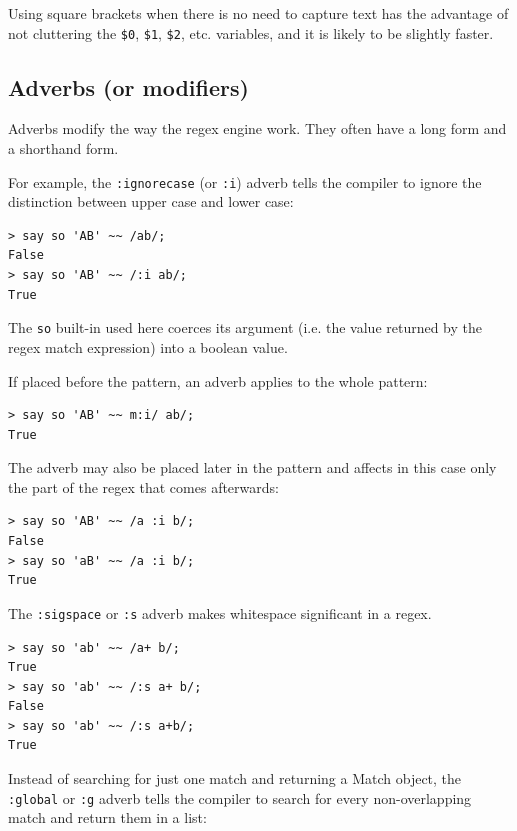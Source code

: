 Using square brackets when there is no need to capture 
text has the advantage of not cluttering the \verb'$0', 
\verb'$1', \verb'$2', etc. variables, and it is likely 
to be slightly faster.

\subsection{Adverbs (or modifiers)}
\label{adverb}

Adverbs modify the way the regex engine work. They often have a 
long form and a shorthand form.

For example, the \verb':ignorecase' (or \verb':i') adverb 
tells the compiler to ignore the distinction between upper 
case and lower case: 

\begin{verbatim}
> say so 'AB' ~~ /ab/;
False
> say so 'AB' ~~ /:i ab/;
True
\end{verbatim}
%

The \verb'so' built-in used here coerces its argument (i.e. 
the value returned by the regex match expression) into 
a boolean value. 

If placed before the pattern, an adverb applies to the 
whole pattern:

\begin{verbatim}
> say so 'AB' ~~ m:i/ ab/;
True
\end{verbatim}
%

The adverb may also be placed later in the pattern and affects 
in this case only the part of the regex that comes afterwards:

\begin{verbatim}
> say so 'AB' ~~ /a :i b/;
False
> say so 'aB' ~~ /a :i b/;
True
\end{verbatim}
%

The \verb':sigspace' or \verb':s' adverb makes whitespace 
significant in a regex.

\begin{verbatim}
> say so 'ab' ~~ /a+ b/;
True
> say so 'ab' ~~ /:s a+ b/;
False
> say so 'ab' ~~ /:s a+b/;
True
\end{verbatim}
%

Instead of searching for just one match and returning a 
Match object, the \verb':global' or \verb':g' adverb tells
the compiler to search for every non-overlapping match 
and return them in a list:

